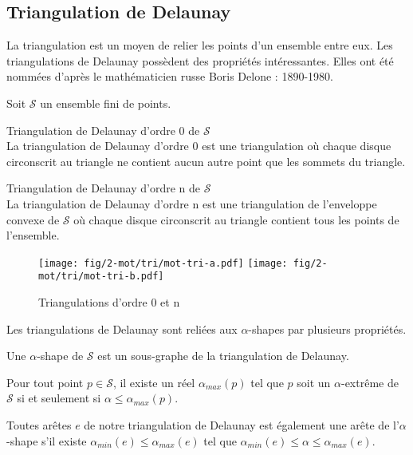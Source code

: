 \subsection{Triangulation de Delaunay}

La triangulation est un moyen de relier les points d'un ensemble entre eux. Les triangulations de Delaunay possèdent des propriétés intéressantes.  Elles ont été nommées d'après le mathématicien russe Boris Delone : 1890-1980.

Soit $\mathcal{S}$ un ensemble fini de points. 

\begin{Definition}{Triangulation de Delaunay d'ordre 0 de $\mathcal{S}$}\\
\label{def:tri-del-0}
  La triangulation de Delaunay d'ordre 0 est une triangulation où chaque disque circonscrit au triangle ne contient aucun autre point que les sommets du triangle.
\end{Definition}

\begin{Definition}{Triangulation de Delaunay d'ordre n de $\mathcal{S}$}\\
\label{def:tri-del-n}
  La triangulation de Delaunay d'ordre n est une triangulation de l'enveloppe convexe de $\mathcal{S}$ où chaque disque circonscrit au triangle contient tous les points de l'ensemble.
\end{Definition}

\begin{figure}[H]
  \centering
  \texttt{[image: fig/2-mot/tri/mot-tri-a.pdf]}
  \texttt{[image: fig/2-mot/tri/mot-tri-b.pdf]}
  \caption{Triangulations d'ordre 0 et n}
\end{figure}


Les triangulations de Delaunay sont reliées aux $\alpha$-shapes par plusieurs propriétés. \cite{EdeKirSei83}

\begin{Lemma}
  Une $\alpha$-shape de $\mathcal{S}$ est un sous-graphe de la triangulation de Delaunay.
\end{Lemma}

\begin{Lemma}
  Pour tout point $p \in \mathcal{S}$, il existe un réel $\alpha_{max}(p)$ tel que $p$ soit un $\alpha$-extrême de $\mathcal{S}$ si et seulement si $\alpha \leq \alpha_{max}(p)$.
\end{Lemma}

\begin{Lemma}
  Toutes arêtes $e$ de notre triangulation de Delaunay est également une arête de l'$\alpha$-shape s'il existe $\alpha_{min}(e) \leq \alpha_{max}(e)$ tel que $\alpha_{min}(e) \leq \alpha \leq \alpha_{max}(e)$.
\end{Lemma}
